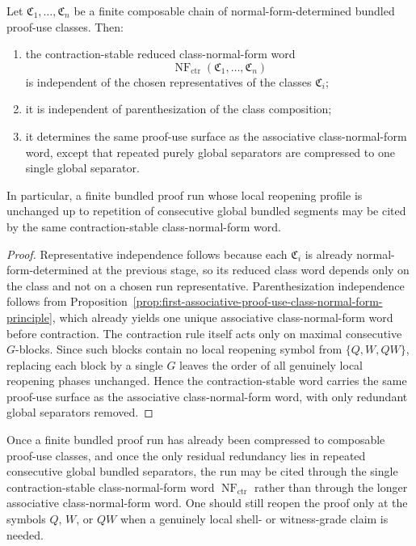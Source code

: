 \begin{proposition}
\label{prop:first-contraction-stable-class-normal-form-principle}
Let $\mathfrak C_1,\dots,\mathfrak C_n$ be a finite composable chain of normal-form-determined bundled proof-use classes. Then:
\begin{enumerate}[leftmargin=2em,label=(\roman*)]
\item the contraction-stable reduced class-normal-form word
\[
\operatorname{NF}_{\mathrm{ctr}}(\mathfrak C_1,\dots,\mathfrak C_n)
\]
is independent of the chosen representatives of the classes $\mathfrak C_i$;
\item it is independent of parenthesization of the class composition;
\item it determines the same proof-use surface as the associative class-normal-form word, except that repeated purely global separators are compressed to one single global separator.
\end{enumerate}
In particular, a finite bundled proof run whose local reopening profile is unchanged up to repetition of consecutive global bundled segments may be cited by the same contraction-stable class-normal-form word.
\end{proposition}

\begin{proof}
Representative independence follows because each $\mathfrak C_i$ is already normal-form-determined at the previous stage, so its reduced class word depends only on the class and not on a chosen run representative. Parenthesization independence follows from Proposition~\ref{prop:first-associative-proof-use-class-normal-form-principle}, which already yields one unique associative class-normal-form word before contraction. The contraction rule itself acts only on maximal consecutive $G$-blocks. Since such blocks contain no local reopening symbol from $\{Q,W,QW\}$, replacing each block by a single $G$ leaves the order of all genuinely local reopening phases unchanged. Hence the contraction-stable word carries the same proof-use surface as the associative class-normal-form word, with only redundant global separators removed.
\end{proof}

\begin{corollary}
\label{cor:use-rule-for-the-first-contraction-stable-class-normal-form-principle}
Once a finite bundled proof run has already been compressed to composable proof-use classes, and once the only residual redundancy lies in repeated consecutive global bundled separators, the run may be cited through the single contraction-stable class-normal-form word $\operatorname{NF}_{\mathrm{ctr}}$ rather than through the longer associative class-normal-form word. One should still reopen the proof only at the symbols $Q$, $W$, or $QW$ when a genuinely local shell- or witness-grade claim is needed.
\end{corollary}

